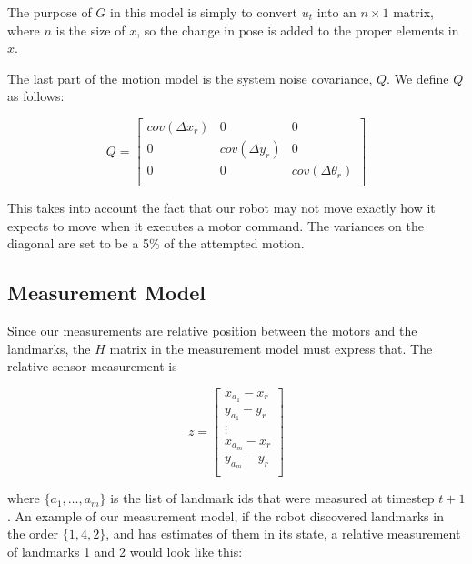 \documentclass[prodmode,acmtecs]{acmsmall} %
\begin{document}
The purpose of $G$ in this model is simply to convert $u_t$ into an $n\times 1$ matrix, where $n$ is the size of $x$, so the change in pose is added to the proper elements in $x$.

The last part of the motion model is the system noise covariance, $Q$. We define $Q$ as follows:

$$
Q = 
\begin{bmatrix}
    cov(\Delta x_r) & 0               & 0 \\
    0               & cov(\Delta y_r) & 0 \\
    0               & 0               & cov(\Delta \theta_r) \\
\end{bmatrix}
$$

This takes into account the fact that our robot may not move exactly how it expects to move when it executes a motor command. The variances on the diagonal are set to be a 5\% of the attempted motion.

\subsection{Measurement Model}

Since our measurements are relative position between the motors and the landmarks, the $H$ matrix in the measurement model must express that. The relative sensor measurement is

$$
z = 
\begin{bmatrix}
    x_{a_1} - x_r \\
    y_{a_1} - y_r \\
    \vdots\\
    x_{a_m} - x_r \\
    y_{a_m} - y_r \\
\end{bmatrix}
$$ 

where $\{a_1,\ldots,a_m\}$ is the list of landmark ids that were measured at timestep $t+1$. An example of our measurement model, if the robot discovered landmarks in the order $\{1,4,2\}$, and has estimates of them in its state, a relative measurement of landmarks 1 and 2 would look like this:
\end{document}
